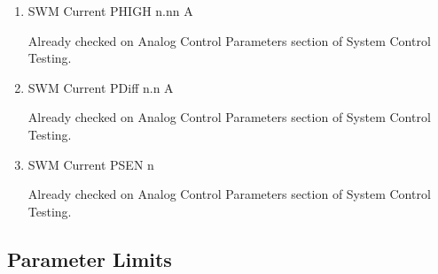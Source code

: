 \documentclass[11pt]{book}		%
\begin{document}
\begin{enumerate}
 \item SWM Current PHIGH n.nn A

\color{red}
Already checked on Analog Control Parameters section of System Control Testing.
\color{black}

 \item SWM Current PDiff n.n A

\color{red}
Already checked on Analog Control Parameters section of System Control Testing.
\color{black}

 \item SWM Current PSEN  n

\color{red}
Already checked on Analog Control Parameters section of System Control Testing.
\color{black}

\end{enumerate}


\subsection{Parameter Limits}
\end{document}
